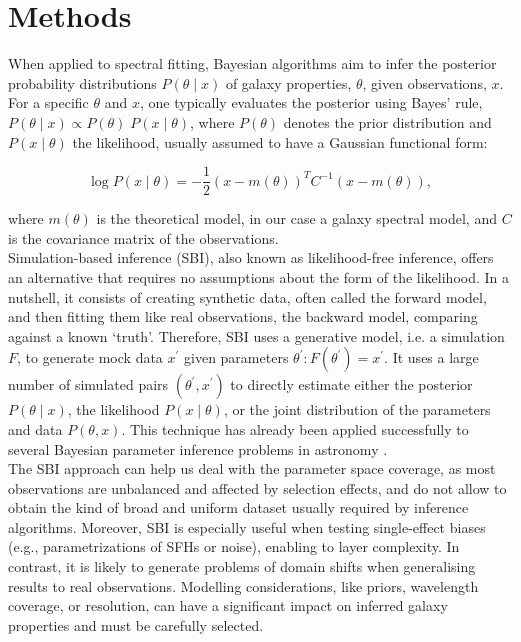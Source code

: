 \section{Methods}
\label{methods}

When applied to spectral fitting, Bayesian algorithms aim to infer the posterior probability distributions $P(\theta \mid x)$ of galaxy properties, $\theta$, given observations, $x$. For a specific $\theta$ and $x$, one typically evaluates the posterior using Bayes' rule, $P(\theta \mid x) \propto P(\theta) \; P(x \mid \theta)$, where $P(\theta)$ denotes the prior distribution and $P(x \mid \theta)$ the likelihood, usually assumed to have a Gaussian functional form:


\begin{equation}
\log P(x \mid \theta)=-\frac{1}{2}(x-m(\theta))^T C^{-1}(x-m(\theta)),
\end{equation}




where $m(\theta)$ is the theoretical model, in our case a galaxy spectral model, and $C$ is the covariance matrix of the observations. \\

Simulation-based inference (SBI), also known as likelihood-free inference, offers an alternative that requires no assumptions about the form of the likelihood. In a nutshell, it consists of creating synthetic data, often called the forward model,  and then fitting them like real observations, the backward model, comparing against a known ‘truth’. Therefore, SBI uses a generative model, i.e. a simulation $F$, to generate mock data $x^{\prime}$ given parameters $\theta^{\prime}: F\left(\theta^{\prime}\right)=x^{\prime}$. It uses a large number of simulated pairs $\left(\theta^{\prime}, x^{\prime}\right)$ to directly estimate either the posterior $P(\theta \mid x)$, the likelihood $P(x \mid \theta)$, or the joint distribution of the parameters and data $P(\theta, x)$. This technique has already been applied successfully to several Bayesian parameter inference problems in astronomy \citep[e.g.][]{Cameron_2012, mishrasharma2022inferring, hahn23,zhang23}.\\

 The SBI approach can help us deal with the parameter space coverage, as most observations are unbalanced and affected by selection effects, and do not allow to obtain the kind of broad and uniform dataset usually required by inference algorithms. Moreover, SBI is especially useful when testing single-effect biases (e.g., parametrizations of SFHs or noise), enabling to layer complexity. In contrast, it is likely to generate problems of domain shifts when generalising results to real observations. Modelling considerations, like priors, wavelength coverage, or resolution, can have a significant impact on inferred galaxy properties \citep{Leja_2019,Hahn_2022} and must be carefully selected.\\ 


